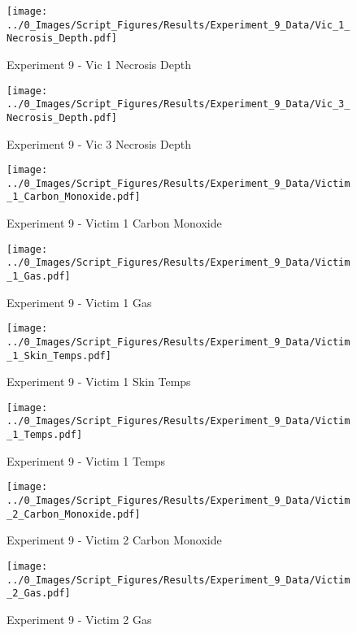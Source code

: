 	\clearpage

	\begin{figure}[H]
		\centering
		\texttt{[image: ../0\_Images/Script\_Figures/Results/Experiment\_9\_Data/Vic\_1\_Necrosis\_Depth.pdf]}
		\caption[]{Experiment 9 - Vic 1 Necrosis Depth}
	\end{figure}
 

	\begin{figure}[H]
		\centering
		\texttt{[image: ../0\_Images/Script\_Figures/Results/Experiment\_9\_Data/Vic\_3\_Necrosis\_Depth.pdf]}
		\caption[]{Experiment 9 - Vic 3 Necrosis Depth}
	\end{figure}
 
	\clearpage

	\begin{figure}[H]
		\centering
		\texttt{[image: ../0\_Images/Script\_Figures/Results/Experiment\_9\_Data/Victim\_1\_Carbon\_Monoxide.pdf]}
		\caption[]{Experiment 9 - Victim 1 Carbon Monoxide}
	\end{figure}
 

	\begin{figure}[H]
		\centering
		\texttt{[image: ../0\_Images/Script\_Figures/Results/Experiment\_9\_Data/Victim\_1\_Gas.pdf]}
		\caption[]{Experiment 9 - Victim 1 Gas}
	\end{figure}
 
	\clearpage

	\begin{figure}[H]
		\centering
		\texttt{[image: ../0\_Images/Script\_Figures/Results/Experiment\_9\_Data/Victim\_1\_Skin\_Temps.pdf]}
		\caption[]{Experiment 9 - Victim 1 Skin Temps}
	\end{figure}
 

	\begin{figure}[H]
		\centering
		\texttt{[image: ../0\_Images/Script\_Figures/Results/Experiment\_9\_Data/Victim\_1\_Temps.pdf]}
		\caption[]{Experiment 9 - Victim 1 Temps}
	\end{figure}
 
	\clearpage

	\begin{figure}[H]
		\centering
		\texttt{[image: ../0\_Images/Script\_Figures/Results/Experiment\_9\_Data/Victim\_2\_Carbon\_Monoxide.pdf]}
		\caption[]{Experiment 9 - Victim 2 Carbon Monoxide}
	\end{figure}
 

	\begin{figure}[H]
		\centering
		\texttt{[image: ../0\_Images/Script\_Figures/Results/Experiment\_9\_Data/Victim\_2\_Gas.pdf]}
		\caption[]{Experiment 9 - Victim 2 Gas}
	\end{figure}
 
